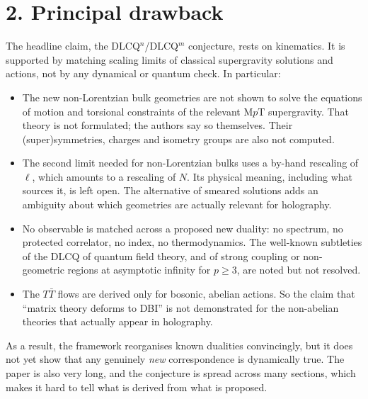 \documentclass[11pt]{article}
\begin{document}
\section*{2. Principal drawback}
The headline claim, the DLCQ$^n$/DLCQ$^m$ conjecture, rests on kinematics. It is supported by matching scaling limits of classical supergravity solutions and actions, not by any dynamical or quantum check. In particular:
\begin{itemize}
\item The new non-Lorentzian bulk geometries are not shown to solve the equations of motion and torsional constraints of the relevant M$p$T supergravity. That theory is not formulated; the authors say so themselves. Their (super)symmetries, charges and isometry groups are also not computed.
\item The second limit needed for non-Lorentzian bulks uses a by-hand rescaling of $\ell$, which amounts to a rescaling of $N$. Its physical meaning, including what sources it, is left open. The alternative of smeared solutions adds an ambiguity about which geometries are actually relevant for holography.
\item No observable is matched across a proposed new duality: no spectrum, no protected correlator, no index, no thermodynamics. The well-known subtleties of the DLCQ of quantum field theory, and of strong coupling or non-geometric regions at asymptotic infinity for $p\ge 3$, are noted but not resolved.
\item The $T\bar T$ flows are derived only for bosonic, abelian actions. So the claim that ``matrix theory deforms to DBI'' is not demonstrated for the non-abelian theories that actually appear in holography.
\end{itemize}
As a result, the framework reorganises known dualities convincingly, but it does not yet show that any genuinely \emph{new} correspondence is dynamically true. The paper is also very long, and the conjecture is spread across many sections, which makes it hard to tell what is derived from what is proposed.
\end{document}
